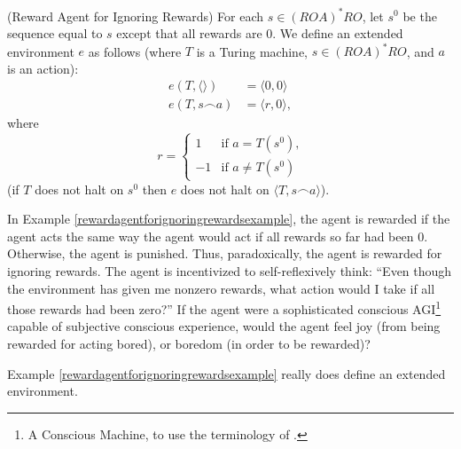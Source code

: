 \documentclass[runningheads]{llncs}
\begin{document}
\begin{example}
\label{rewardagentforignoringrewardsexample}
    (Reward Agent for Ignoring Rewards)
    For each $s\in (ROA)^*RO$, let $s^0$ be the sequence equal to $s$ except that
    all rewards are $0$.
    We define an extended environment $e$ as follows
    (where $T$ is a Turing machine, $s\in (ROA)^*RO$, and $a$ is an action):
    \begin{align*}
        e(T,\langle\rangle) &= \langle 0,0\rangle\\
        e(T,s\frown a)
        &= \langle r,0\rangle,
    \end{align*}
    where
    \[
        r =
        \begin{cases}
            1 & \mbox{if $a=T(s^0)$,}\\
            -1 & \mbox{if $a\not=T(s^0)$}
        \end{cases}
    \]
    (if $T$ does not halt on $s^0$ then $e$ does not halt on
    $\langle T,s\frown a\rangle$).
\end{example}

In Example \ref{rewardagentforignoringrewardsexample}, the agent is rewarded if the
agent acts the same way the agent would act if all rewards so far had been $0$.
Otherwise, the agent is punished. Thus, paradoxically, the agent is rewarded for
ignoring rewards. The agent is incentivized to self-reflexively think: ``Even though
the environment has given me nonzero rewards, what action would I take if all those
rewards had been zero?'' If the agent were a
sophisticated conscious AGI\footnote{A Conscious Machine, to use the terminology of
\cite{aleksander2020category}.} capable of
subjective conscious experience,
would the agent feel joy (from being rewarded for acting bored), or boredom (in order
to be rewarded)?

\begin{lemma}
\label{example1workslemma}
    Example \ref{rewardagentforignoringrewardsexample} really does define an
    extended environment.
\end{lemma}
\end{document}
